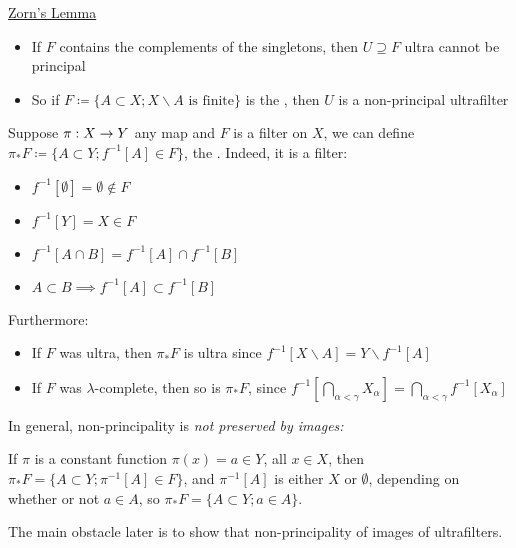 \documentclass[]{article}
\begin{document}

\underline{Zorn's Lemma}
\begin{itemize}
    \item If $F$ contains the complements of the singletons, then $U\supseteq F$ ultra cannot be principal
    \item So if $F\coloneqq\{A\subset X; X\backslash A\textrm{ is finite}\}$ is the , then $U$ is a non-principal ultrafilter
\end{itemize}

Suppose $\pi:X\rightarrow Y$ any map and $F$ is a filter on $X$, we can define $\pi_\ast F\coloneqq \{A\subset Y; f^{-1}[A]\in F\}$, the . Indeed, it is a filter:

\begin{itemize}
    \item $f^{-1}[\emptyset] = \emptyset \not\in F$
    \item $f^{-1}[Y] = X\in F$
    \item $f^{-1}[A\cap B] = f^{-1}[A] \cap f^{-1}[B]$
    \item $A\subset B\implies f^{-1}[A]\subset f^{-1}[B]$
\end{itemize}

Furthermore:
\begin{itemize}
    \item If $F$ was ultra, then $\pi_\ast F$ is ultra since $f^{-1}[X\backslash A] = Y\backslash f^{-1}[A]$
    \item If $F$ was $\lambda$-complete, then so is $\pi_\ast F$, since $f^{-1}[\bigcap_{\alpha < \gamma}X_\alpha] = \bigcap_{\alpha < \gamma}f^{-1}[X_\alpha]$
\end{itemize}

In general, non-principality is \it{not} preserved by images:

If $\pi$ is a constant function $\pi(x) = a\in Y$, all $x \in X$, then $\pi_\ast F = \{A\subset Y;\pi^{-1}[A]\in F\}$, and $\pi^{-1}[A]$ is either $X$ or $\emptyset$, depending on whether or not $a \in A$, so $\pi_\ast F = \{A\subset Y;a \in A\}$.

\begin{remark*}
    The main obstacle later is to show that non-principality of images of ultrafilters.
\end{remark*}
\end{document}
